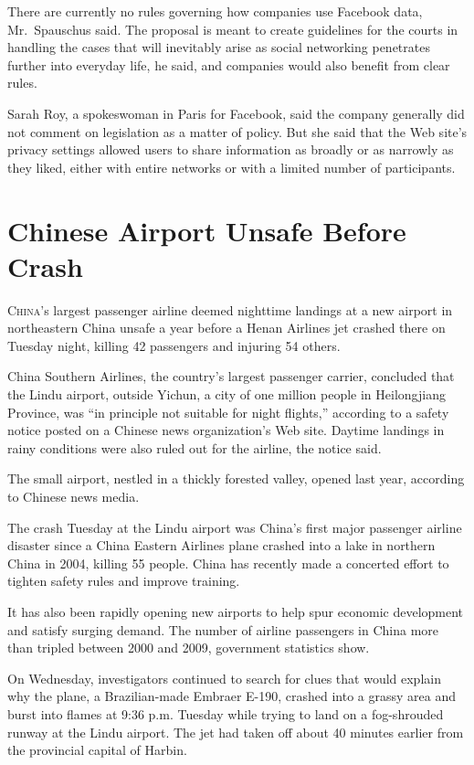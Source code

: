 ﻿\documentclass[12pt]{article}
\begin{document}
There are currently no rules governing how companies use Facebook data, Mr.~Spauschus said. The
proposal is meant to create guidelines for the courts in handling the cases that will inevitably
arise as social networking penetrates further into everyday life, he said, and companies would also
benefit from clear rules.

Sarah Roy, a spokeswoman in Paris for Facebook, said the company generally did not comment on
legislation as a matter of policy. But she said that the Web site's privacy settings allowed users
to share information as broadly or as narrowly as they liked, either with entire networks or with a
limited number of participants.

\pagebreak
\section{Chinese Airport Unsafe Before Crash}

\lettrine{C}{hina}'s largest passenger airline deemed nighttime landings at
a new airport in northeastern China unsafe a year before a Henan Airlines jet crashed there on
Tuesday night, killing 42 passengers and injuring 54 others.

China Southern Airlines, the country's largest passenger carrier, concluded that the Lindu airport,
outside Yichun, a city of one million people in Heilongjiang Province, was ``in principle not
suitable for night flights,'' according to a safety notice posted on a Chinese news organization's
Web site. Daytime landings in rainy conditions were also ruled out for the airline, the notice said.

The small airport, nestled in a thickly forested valley, opened last year, according to Chinese news
media.

The crash Tuesday at the Lindu airport was China's first major passenger airline disaster since a
China Eastern Airlines plane crashed into a lake in northern China in 2004, killing 55 people. China
has recently made a concerted effort to tighten safety rules and improve training.

It has also been rapidly opening new airports to help spur economic development and satisfy surging
demand. The number of airline passengers in China more than tripled between 2000 and 2009,
government statistics show.

On Wednesday, investigators continued to search for clues that would explain why the plane, a
Brazilian-made Embraer E-190, crashed into a grassy area and burst into flames at 9:36 p.m. Tuesday
while trying to land on a fog-shrouded runway at the Lindu airport. The jet had taken off about 40
minutes earlier from the provincial capital of Harbin.
\end{document}
